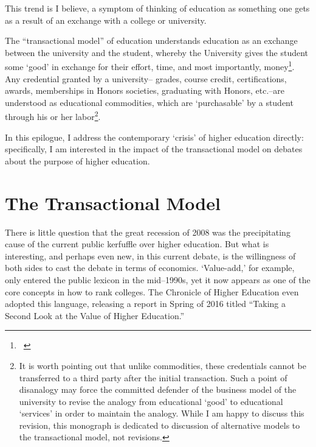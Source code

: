 This trend is I believe, a symptom of thinking of education as something one gets as a result of an exchange with a college or university. 

The ``transactional model'' of education understands education as an exchange between the university and the student, whereby the University gives the student some `good' in exchange for their effort, time, and most importantly, money\footnote{~\citep{Dees:2007wf}}. Any credential granted by a university-- grades, course credit, certifications, awards, memberships in Honors societies, graduating with Honors, etc.--are understood as educational commodities, which are `purchasable' by a student through his or her labor\footnote{It is worth pointing out that unlike commodities, these credentials cannot be transferred to a third party after the initial transaction. Such a point of disanalogy may force the committed defender of the business model of the university to revise the analogy from educational `good' to educational `services' in order to maintain the analogy. While I am happy to discuss this revision, this monograph is dedicated to discussion of alternative models to the transactional model, not revisions.}.

In this epilogue, I address the contemporary `crisis' of higher education directly: specifically, I am interested in the impact of the transactional model on debates about the purpose of higher education.

\section{The Transactional Model}
\label{thetransactionalmodel}

There is little question that the great recession of 2008 was the precipitating cause of the current public kerfuffle over higher education. But what is interesting, and perhaps even new, in this current debate, is the willingness of both sides to cast the debate in terms of economics. `Value-add,' for example, only entered the public lexicon in the mid--1990s, yet it now appears as one of the core concepts in how to rank colleges. The Chronicle of Higher Education even adopted this language, releasing a report in Spring of 2016 titled ``Taking a Second Look at the Value of Higher Education.'' 

